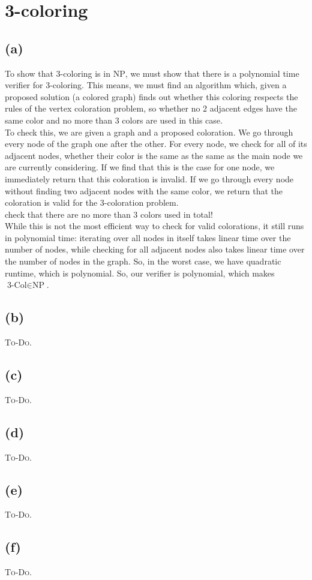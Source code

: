 

\setcounter{section}{2}


\section{3-coloring}

\subsection{(a)}

To show that 3-coloring is in \textsc{NP}, we must show that there is a polynomial time verifier for 3-coloring. This means, we must find an algorithm which, given a proposed solution (a colored graph) finds out whether this coloring respects the rules of the vertex coloration problem, so whether no 2 adjacent edges have the same color and no more than 3 colors are used in this case.\\
To check this, we are given a graph and a proposed coloration. We go through every node of the graph one after the other. For every node, we check for all of its adjacent nodes, whether their color is the same as the same as the main node we are currently considering. If we find that this is the case for one node, we immediately return that this coloration is invalid. If we go through every node without finding two adjacent nodes with the same color, we return that the coloration is valid for the 3-coloration problem.\\
{\color{red} check that there are no more than 3 colors used in total!}\\
While this is not the most efficient way to check for valid colorations, it still runs in polynomial time: iterating over all nodes in itself takes linear time over the number of nodes, while checking for all adjacent nodes also takes linear time over the number of nodes in the graph. So, in the worst case, we have quadratic runtime, which is polynomial. So, our verifier is polynomial, which makes $\text{3-Col}\in\text{NP}$.

\subsection{(b)}

\textsc{To-Do.}

\subsection{(c)}

\textsc{To-Do.}

\subsection{(d)}

\textsc{To-Do.}

\subsection{(e)}

\textsc{To-Do.}

\subsection{(f)}

\textsc{To-Do.}


